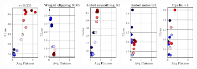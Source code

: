 \begin{figure}
	\centering
	\vspace*{-0.2cm}
	\begin{minipage}[t]{0.11\textwidth}
		\includegraphics[height=3.25cm]{plots_supp_flatness_epochs_correlation_joint_eps}
	\end{minipage}
	\begin{minipage}[t]{0.12\textwidth}
		\includegraphics[height=3.25cm]{plots_supp_flatness_epochs_correlation_joint_0005p}
	\end{minipage}
	\begin{minipage}[t]{0.11\textwidth}
		\includegraphics[height=3.25cm]{plots_supp_flatness_epochs_correlation_joint_ls03}
	\end{minipage}
	\begin{minipage}[t]{0.11\textwidth}
		\includegraphics[height=3.25cm]{plots_supp_flatness_epochs_correlation_joint_ln03}
	\end{minipage}
	\begin{minipage}[t]{0.11\textwidth}
		\includegraphics[height=3.25cm]{plots_supp_flatness_epochs_correlation_joint_cyc4}

\end{minipage}
\end{figure}
